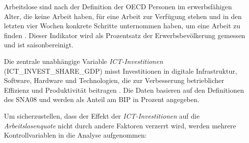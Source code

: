 Arbeitslose sind nach der Definition der \ac{OECD} Personen im erwerbsfähigen Alter, die keine 
Arbeit haben, für eine Arbeit zur Verfügung stehen und in den letzten vier Wochen konkrete 
Schritte unternommen haben, um eine Arbeit zu finden \parencite{oecd2022unemployment}. Dieser 
Indikator wird als Prozentsatz der Erwerbsbevölkerung gemessen und ist saisonbereinigt.

Die zentrale unabhängige Variable \textit{\ac{ICT}-Investitionen} (ICT\_INVEST\_SHARE\_GDP) 
misst Investitionen in digitale Infrastruktur, Software, Hardware und Technologien, die zur 
Verbesserung betrieblicher Effizienz und Produktivität beitragen \parencite{oecd2022ict}. Die 
Daten basieren auf den Definitionen des \ac{SNA08} und werden als Anteil am \ac{BIP} in 
Prozent angegeben.

Um sicherzustellen, dass der Effekt der \textit{\ac{ICT}-Investitionen} auf die 
\textit{Arbeitslosenquote} nicht durch andere Faktoren verzerrt wird, werden mehrere 
Kontrollvariablen in die Analyse aufgenommen:

